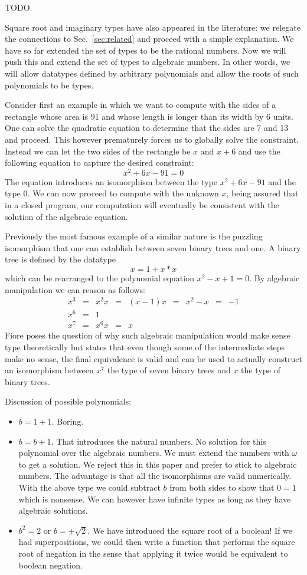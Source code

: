 \documentclass[preprint]{sigplanconf}
\begin{document}
{TODO.

Square root and imaginary types have also appeared in the literature: we
relegate the connections to Sec.~\ref{sec:related} and proceed with a simple
explanation. We have so far extended the set of types to be the rational
numbers. Now we will push this and extend the set of types to algebraic
numbers. In other words, we will allow datatypes defined by arbitrary
polynomials and allow the roots of such polynomials to be types. 

Consider first an example in which we want to compute with the sides of a
rectangle whose area is 91 and whose length is longer than its width by 6
units. One can solve the quadratic equation to determine that the sides are 7
and 13 and proceed. This however prematurely forces us to globally solve the
constraint. Instead we can let the two sides of the rectangle be $x$ and
$x+6$ and use the following equation to capture the desired constraint:
\[
x^2 + 6x - 91 = 0
\]
The equation introduces an isomorphism between the type $x^2 + 6x - 91$ and
the type $0$. We can now proceed to compute with the unknown $x$, being
assured that in a closed program, our computation will eventually be
consistent with the solution of the algebraic equation. 

Previously the most famous example of a similar nature is the puzzling
isomorphism that one can establish between seven binary trees and one.
A binary tree is defined by the datatype
\[
x = 1 + x * x 
\]
which can be rearranged to the polynomial equation $x^2 - x + 1 = 0$. By
algebraic manipulation we can reason as follows:
\[\begin{array}{rclclclcl}
x^3 &=& x^2 x &=& (x-1) x &=& x^2 - x &=& -1 \\
x^6 &=& 1 \\
x^7 &=& x^6 x &=& x
\end{array}\]
Fiore poses the question of why such algebraic manipulation would make sense
type theoretically but states that even though some of the intermediate steps
make no sense, the final equivalence is valid and can be used to actually
construct an isomorphism between $x^7$ the type of seven binary trees 
and $x$ the type of binary trees.

Discussion of possible polynomials:
\begin{itemize}
\item $b=1+1$. Boring.
\item $b=b+1$. That introduces the natural numbers. No solution for this
  polynomial over the algebraic numbers. We must extend the numbers with
  $\omega$ to get a solution. We reject this in this paper and prefer to
  stick to algebraic numbers. The advantage is that all the isomorphisms are
  valid numerically. With the above type we could subtract $b$ from both
  sides to show that $0=1$ which is nonsense. We can however have infinite
  types as long as they have algebraic solutions.
\item $b^2=2$ or $b = \pm \sqrt{2}$. We have introduced the square root of a
  boolean! If we had superpositions, we could then write a function that
  performs the square root of negation in the sense that applying it twice
  would be equivalent to boolean negation.
\end{itemize}

}
\end{document}
